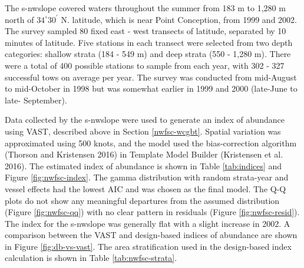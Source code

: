 \documentclass[11pt,
  english,
  a4paper,
]{article}
\begin{document}
\leavevmode\tagmcend\tagstructend


The \gls{s-nwslope} covered waters throughout the summer from 183 m to 1,280 m north of {\(34^\circ 30^\prime\)\leavevmode\tagmcend\tagstructend} N. latitude, which is near Point Conception, from 1999 and 2002. The survey sampled 80 fixed east - west transects of latitude, separated by 10 minutes of latitude. Five stations in each transect were selected from two depth categories: shallow strata (184 - 549 m) and deep strata (550 - 1,280 m). There were a total of 400 possible stations to sample from each year, with 302 - 327 successful tows on average per year. The survey was conducted from mid-August to mid-October in 1998 but was somewhat earlier in 1999 and 2000 (late-June to late- September).

\leavevmode\tagmcend\tagstructend\par


Data collected by the \gls{s-nwslope} were used to generate an index of abundance using VAST, described above in Section \ref{nwfsc-wcgbt}. Spatial variation was approximated using 500 knots, and the model used the bias-correction algorithm {(Thorson and Kristensen 2016)\leavevmode\tagmcend\tagstructend} in Template Model Builder {(Kristensen et al. 2016)\leavevmode\tagmcend\tagstructend}. The estimated index of abundance is shown in Table \ref{tab:indices} and Figure \ref{fig:nwfsc-index}. The gamma distribution with random strata-year and vessel effects had the lowest AIC and was chosen as the final model. The Q-Q plots do not show any meaningful departures from the assumed distribution (Figure \ref{fig:nwfsc-qq}) with no clear pattern in residuals (Figure \ref{fig:nwfsc-resid}). The index for the \gls{s-nwslope} was generally flat with a slight increase in 2002. A comparison between the VAST and design-based indices of abundance are shown in Figure \ref{fig:db-vs-vast}. The area stratification used in the design-based index calculation is shown in Table \ref{tab:nwfsc-strata}.

\leavevmode\tagmcend\tagstructend\par

\end{document}
